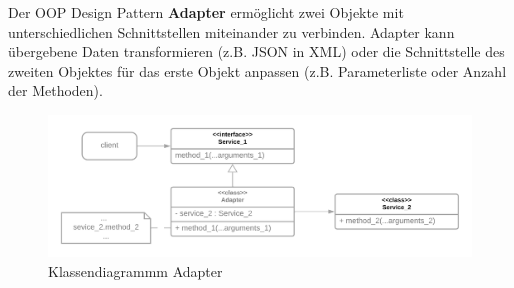 Der OOP Design Pattern \textbf{Adapter} ermöglicht zwei Objekte mit unterschiedlichen Schnittstellen miteinander zu verbinden.
Adapter kann übergebene Daten transformieren (z.B. JSON in XML) oder die Schnittstelle des zweiten Objektes für das erste Objekt anpassen
(z.B. Parameterliste oder Anzahl der Methoden).

\begin{figure}[H]
    \centering
    \includegraphics[width=1\textwidth]{Images/OOPAdapter.png}
    \caption[UML Adapter]{Klassendiagrammm Adapter}
    \label{fig:cd_adapter }
\end{figure}